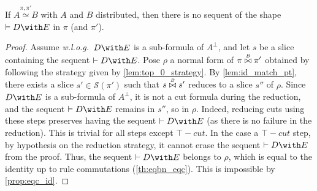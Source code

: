 \documentclass{lmcs}
\newcommand*{\orth}{^\perp} %
\renewcommand*{\fCenter}{\vdash} %
\newcommand*{\wolog}{\emph{w.l.o.g.}}
\newcommand*{\Slices}{\mathcal{S}}
\newcommand*{\iso}{\mathrel{\simeq}} %
\newcommand{\symboltext}[2]{\mathrel{\overset{\makebox[0pt]{\mbox{\normalfont\tiny\sffamily \ensuremath{#1}}}}{#2}}} %
\newcommand*{\cutf}[3]{\ensuremath{#1\symboltext{#3}{\bowtie} #2}}
\newcommand{\isoproofs}[4]{\overset{\ensuremath{#3,#4}}{#1\iso #2}}
\begin{document}
\begin{lem}
\label{lem:eqct_id_with}
If $\isoproofs{A}{B}{\pi}{\pi'}$ with $A$ and $B$ distributed, then there is no sequent of the shape $\fCenter D\with E$ in $\pi$ (and $\pi'$).
\end{lem}
\begin{proof}
Assume \wolog\ $D\with E$ is a sub-formula of $A\orth$, and let $s$ be a slice containing the sequent $\fCenter D\with E$.
Pose $\rho$ a normal form of $\cutf{\pi}{\pi'}{B}$ obtained by following the strategy given by \autoref{lem:top_0_strategy}.
By \autoref{lem:id_match_pt}, there exists a slice $s'\in\Slices(\pi')$ such that $\cutf{s}{s'}{B}$ reduces to a slice $s''$ of $\rho$.
Since $D\with E$ is a sub-formula of $A\orth$, it is not a cut formula during the reduction, and the sequent $\fCenter D\with E$ remains in $s''$, so in $\rho$.
Indeed, reducing cuts using these steps preserves having the sequent $\fCenter D\with E$ (as there is no failure in the reduction).
This is trivial for all steps except $\top-cut$.
In the case a $\top-cut$ step, by hypothesis on the reduction strategy, it cannot erase the sequent $\fCenter D\with E$ from the proof.
Thus, the sequent $\fCenter D\with E$ belongs to $\rho$, which is equal to the identity up to rule commutations (\autoref{th:eqbn_eqc}).
This is impossible by \autoref{prop:eqc_id}.
\end{proof}
\end{document}

